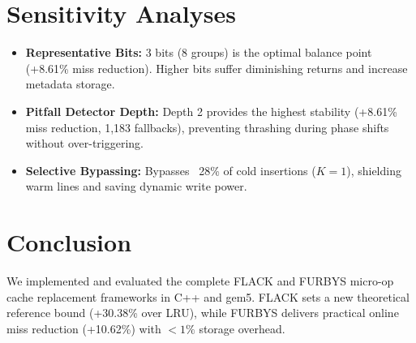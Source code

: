 \documentclass[10pt,twocolumn]{article}
\begin{document}
\section{Sensitivity Analyses}
\begin{itemize}
    \item \textbf{Representative Bits:} 3 bits (8 groups) is the optimal balance point (+8.61\% miss reduction). Higher bits suffer diminishing returns and increase metadata storage.
    \item \textbf{Pitfall Detector Depth:} Depth 2 provides the highest stability (+8.61\% miss reduction, 1,183 fallbacks), preventing thrashing during phase shifts without over-triggering.
    \item \textbf{Selective Bypassing:} Bypasses ~28\% of cold insertions ($K=1$), shielding warm lines and saving dynamic write power.
\end{itemize}

\section{Conclusion}
We implemented and evaluated the complete FLACK and FURBYS micro-op cache replacement frameworks in C++ and gem5. FLACK sets a new theoretical reference bound (+30.38\% over LRU), while FURBYS delivers practical online miss reduction (+10.62\%) with $<1\%$ storage overhead.
\end{document}
